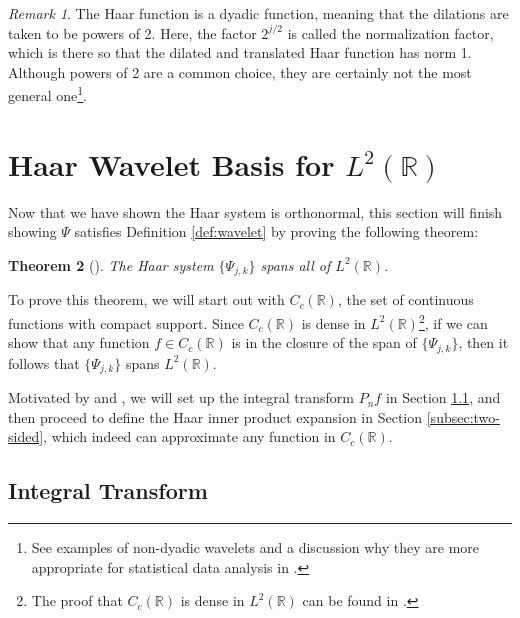 \documentclass[11pt]{amsart}
\theoremstyle{theorem} %
\newtheorem{thm}{Theorem}[section] %
\theoremstyle{definition}
\theoremstyle{example}
\theoremstyle{remark}
\newtheorem{rem}[thm]{Remark}
\numberwithin{equation}{section}
\newcommand{\R}{\mathbb{R}}
\begin{document}
\begin{rem}
	The Haar function is a dyadic function, meaning that the dilations are taken to be powers of 2. Here, the factor $ 2^{j/2} $ is called the normalization factor, which is there so that the dilated and translated Haar function has norm 1. Although powers of 2 are a common choice, they are certainly not the most general one\footnote{See examples of non-dyadic wavelets and a discussion why they are more appropriate for statistical data analysis in \cite{pollock}.}.
\end{rem}


\section{Haar Wavelet Basis for $ L^2(\R) $} \label{section:span}
Now that we have shown the Haar system is orthonormal, this section will finish showing $ \varPsi $ satisfies Definition \ref{def:wavelet} by proving the following theorem:

\begin{thm}[{\cite[411]{davidson}}] \label{thm:span}
	The Haar system $ \{ \varPsi_{j,k} \} $ spans all of $ L^2(\R) $.
\end{thm}

To prove this theorem, we will start out with $ C_c(\R) $, the set of continuous functions with compact support. Since $ C_c(\R) $ is dense in $ L^2(\R) $\footnote{The proof that $ C_c(\R) $ is dense in $ L^2(\R) $ can be found in \cite[326]{farrell}.}, if we can show that any function $ f \in C_c(\R) $ is in the closure of the span of $ \{\varPsi_{j,k}\} $, then it follows that $ \{ \varPsi_{j,k} \} $ spans $ L^2(\R) $.

Motivated by \cite[3]{bell} and \cite[516]{davidson}, we will set up the integral transform $ P_nf $ in Section \ref{subsec:integral transform}, and then proceed to define the Haar inner product expansion in Section \ref{subsec:two-sided}, which indeed can approximate any function in $ C_c(\R) $.

\subsection{Integral Transform} \label{subsec:integral transform}
\end{document}
